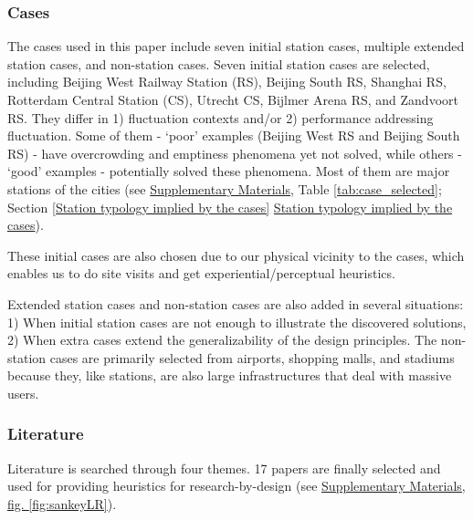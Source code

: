 \documentclass[]{article}
\begin{document}
\subsubsection{Cases}
\label{Cases}
The cases used in this paper include seven initial station cases, multiple extended station cases, and non-station cases. Seven initial station cases are selected, including Beijing West Railway Station (RS), Beijing South RS, Shanghai RS, Rotterdam Central Station (CS), Utrecht CS, Bijlmer Arena RS, and Zandvoort RS. They differ in 1) fluctuation contexts and/or 2) performance addressing fluctuation. Some of them - `poor' examples (Beijing West RS and Beijing South RS) - have overcrowding and emptiness phenomena yet not solved, while others - `good' examples - potentially solved these phenomena. Most of them are major stations of the cities (see \href{https://github.com/1309928130/Paper3_SupplementaryMaterials/blob/main/SupplementaryMaterials.pdf}{Supplementary Materials}, Table \ref{tab:case_selected}; Section \ref{Station typology implied by the cases} \hyperref[Station typology implied by the cases]{Station typology implied by the cases}). 

These initial cases are also chosen due to our physical vicinity to the cases, which enables us to do site visits and get experiential/perceptual heuristics. 

Extended station cases and non-station cases are also added in several situations: 1) When initial station cases are not enough to illustrate the discovered solutions, 2) When extra cases extend the generalizability of the design principles. The non-station cases are primarily selected from airports, shopping malls, and stadiums because they, like stations, are also large infrastructures that deal with massive users.



\subsubsection{Literature}
\label{Literature}
Literature is searched through four themes. 17 papers are finally selected and used for providing heuristics for research-by-design (see \href{https://github.com/1309928130/Paper3_SupplementaryMaterials/blob/main/SupplementaryMaterials.pdf}{Supplementary Materials, fig. \ref{fig:sankeyLR}}). 
\end{document}
